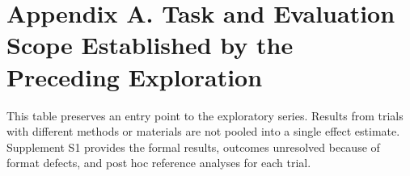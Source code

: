 \documentclass[10pt,a4paper]{article}
\newlength{\usable}
\begin{document}
\endgroup

\clearpage

\section{Appendix A. Task and Evaluation Scope Established by the Preceding Exploration}\label{paper-03-appendix-a.-task-and-evaluation-scope-established-by-the-preceding-exploration}

This table preserves an entry point to the exploratory series. Results from trials with different methods or materials are not pooled into a single effect estimate. Supplement S1 provides the formal results, outcomes unresolved because of format defects, and post hoc reference analyses for each trial.

\Needspace{115pt}
\begingroup\fontsize{9.1}{12}\selectfont\setlength{\parskip}{1pt}
\setlength{\usable}{\dimexpr\linewidth-4\tabcolsep\relax}
\end{document}
